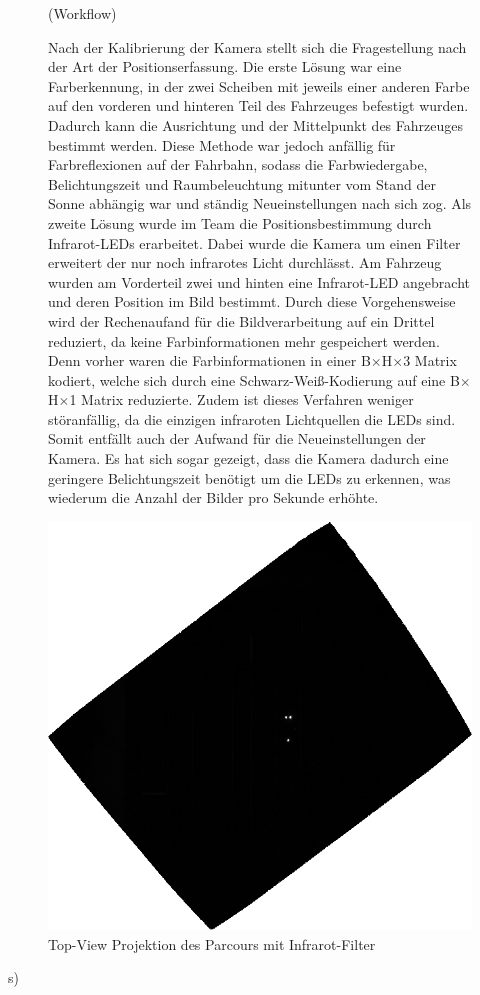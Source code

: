 \begin{figure}[H]
(Workflow)    

Nach der Kalibrierung der Kamera stellt sich die Fragestellung nach der Art der Positionserfassung. Die erste Lösung war eine Farberkennung, in der zwei Scheiben mit jeweils einer anderen Farbe auf den vorderen und hinteren Teil des Fahrzeuges befestigt wurden. Dadurch kann die Ausrichtung und der Mittelpunkt des Fahrzeuges bestimmt werden. Diese Methode war jedoch anfällig für Farbreflexionen auf der Fahrbahn, sodass die Farbwiedergabe, Belichtungszeit und Raumbeleuchtung mitunter vom Stand der Sonne abhängig war und ständig Neueinstellungen nach sich zog. Als zweite Lösung wurde im Team die Positionsbestimmung durch Infrarot-LEDs erarbeitet. Dabei wurde die Kamera um einen Filter erweitert der nur noch infrarotes Licht durchlässt. Am Fahrzeug wurden am Vorderteil zwei und hinten eine Infrarot-LED angebracht und deren Position im Bild bestimmt. Durch diese Vorgehensweise wird der Rechenaufand für die Bildverarbeitung auf ein Drittel reduziert, da keine Farbinformationen mehr gespeichert werden. Denn vorher waren die Farbinformationen in einer B$\times$H$\times$3 Matrix kodiert, welche sich durch eine Schwarz-Weiß-Kodierung auf eine B$\times$H$\times$1 Matrix reduzierte. Zudem ist dieses Verfahren weniger störanfällig, da die einzigen infraroten Lichtquellen die LEDs sind. Somit entfällt auch der Aufwand für die Neueinstellungen der Kamera. Es hat sich sogar gezeigt, dass die Kamera dadurch eine geringere Belichtungszeit benötigt um die LEDs zu erkennen, was wiederum die Anzahl der Bilder pro Sekunde erhöhte.  
\end{figure}
\begin{figure}[H]
\centering
\includegraphics[scale=0.4]{Bilder/NonPerspektiveCarLight.png} 
\caption{Top-View Projektion des Parcours mit Infrarot-Filter}
\label{fig:NonPersIR}
\end{figure}s)  

